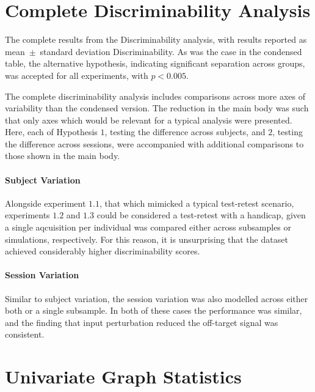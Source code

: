 \documentclass[fleqn,10pt]{SelfArx} %
\begin{document}
\clearpage
\section{Complete Discriminability Analysis}
\label{supsec:discrimfull}

\begin{table}[ht]\centering
\caption{The complete results from the Discriminability analysis, with results reported as mean~$\pm$~standard
deviation Discriminability. As was the case in the condensed table, the alternative hypothesis, indicating significant
separation across groups, was accepted for all experiments, with $p < 0.005$.}
\vspace{5pt}

\label{stab:discrim_full}
\end{table}

The complete discriminability analysis includes comparisons across more axes of variability than the condensed version.
The reduction in the main body was such that only axes which would be relevant for a typical analysis were presented.
Here, each of Hypothesis $1$, testing the difference across subjects, and $2$, testing the difference across sessions,
were accompanied with additional comparisons to those shown in the main body.

\paragraph{Subject Variation}
Alongside experiment $1.1$, that which mimicked a typical test-retest scenario, experiments $1.2$ and $1.3$ could be
considered a test-retest with a handicap, given a single aqcuisition per individual was compared either across
subsamples or simulations, respectively. For this reason, it is unsurprising that the dataset achieved considerably
higher discriminability scores. 

\paragraph{Session Variation}
Similar to subject variation, the session variation was also modelled across either both or a single subsample. In both
of these cases the performance was similar, and the finding that input perturbation reduced the off-target signal was
consistent.

\clearpage
\section{Univariate Graph Statistics}
\label{supsec:univar}
\end{document}
